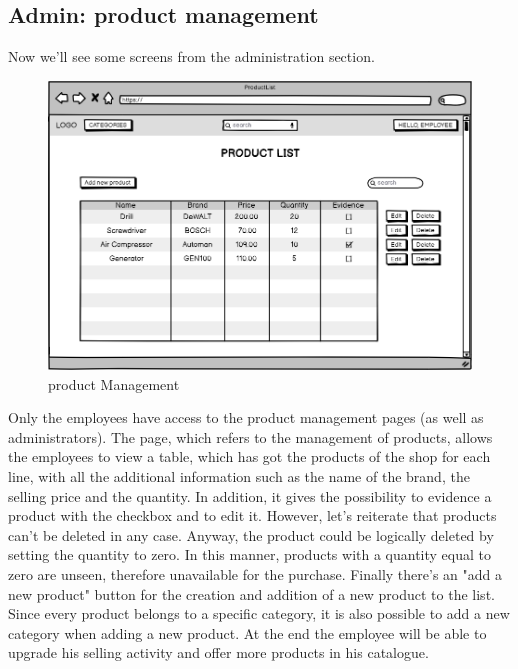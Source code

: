 \subsection{Admin: product management}
Now we'll see some screens from the administration section. 
\begin{figure}[H]
\centering
  \includegraphics[width=\textwidth,height=\textheight,keepaspectratio]{mockups/productListPageMockup.png}
  \caption{product Management}
\end{figure}
Only the employees have access to the product management pages (as well as administrators). The page, which refers to the management of products, allows the employees to view a table, which has got the products of the shop for each line, with all the additional information such as the name of the brand, the selling price and the quantity. In addition, it gives the possibility to evidence a product with the checkbox and to edit it. However, let's reiterate that products can't be deleted in any case. Anyway, the product could be logically deleted by setting the quantity to zero. In this manner, products with a quantity equal to zero are unseen, therefore unavailable for the purchase. Finally there's an "add a new product" button for the creation and addition of a new product to the list. Since every product belongs to a specific category, it is also possible to add a new category when adding a new product.
At the end the employee will be able to upgrade his selling activity and offer more products in his catalogue. 
    
